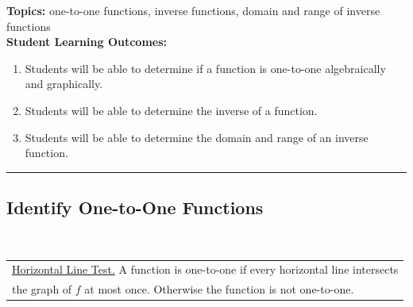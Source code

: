 


\noindent \textbf{Topics:}  one-to-one functions, inverse functions, domain and range of inverse functions\\

\noindent \textbf{Student Learning Outcomes:}
\begin{enumerate}
\item Students will be able to determine if a function is one-to-one algebraically and graphically.
\item Students will be able to determine the inverse of a function.
\item Students will be able to determine the domain and range of an inverse function.
\end{enumerate}

\hrule 

\bigskip

\subsection{Identify One-to-One Functions} ~


\noindent \begin{tabular}{ | l  |} \hline
\noindent \underline{Horizontal Line Test.} A function is one-to-one if every horizontal line intersects \\ the graph of $f$ at most once. Otherwise the function is not one-to-one. \\  \hline
\end{tabular} 

